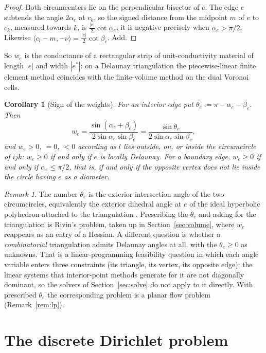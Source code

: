 \documentclass[11pt]{amsart}
\newtheorem{corollary}[theorem]{Corollary}
\theoremstyle{definition}
\theoremstyle{remark}
\newtheorem{remark}[theorem]{Remark}
\begin{document}
\begin{proof}
Both circumcenters lie on the perpendicular bisector of $e$. The edge $e$ subtends the angle $2\alpha_e$ at $c_k$, so the signed
distance from the midpoint $m$ of $e$ to $c_k$, measured towards $k$, is $\frac{|e|}2\cot\alpha_e$; it is negative precisely when
$\alpha_e>\pi/2$. Likewise $\langle c_l-m,-\nu\rangle=\frac{|e|}{2}\cot\beta_e$. Add.
\end{proof}

So $w_e$ is the conductance of a rectangular strip of unit-conductivity material of length $|e|$ and width $|e^*|$: on a
Delaunay triangulation the piecewise-linear finite element method coincides with the finite-volume method on the dual Voronoi
cells.

\begin{corollary}[Sign of the weights]\label{cor:sign}
For an interior edge put $\theta_e:=\pi-\alpha_e-\beta_e$. Then
\[
w_e=\frac{\sin(\alpha_e+\beta_e)}{2\sin\alpha_e\sin\beta_e}=\frac{\sin\theta_e}{2\sin\alpha_e\sin\beta_e},
\]
and $w_e>0$, $=0$, $<0$ according as $l$ lies outside, on, or inside the circumcircle of $ijk$: $w_e\ge0$ if and only if $e$ is
\emph{locally Delaunay}. For a boundary edge, $w_e\geq0$ if and only if $\alpha_e\le\pi/2$, that is, if and only if the opposite vertex does not lie inside
the circle having $e$ as a diameter.
\end{corollary}

\begin{remark}\label{rem:theta}
The number $\theta_e$ is the exterior intersection angle of the two circumcircles, equivalently the exterior dihedral angle at $e$ of the ideal
hyperbolic polyhedron attached to the triangulation \cite{Riv94}. Prescribing the $\theta_e$ and asking for the triangulation is Rivin's problem, taken up in Section~\ref{sec:volume}, where $w_e$ reappears as an entry of a Hessian.
A different question is whether a \emph{combinatorial} triangulation admits Delaunay angles at all, with the $\theta_e\ge0$ as unknowns. That is a linear-programming
feasibility question in which each angle variable enters three constraints (its triangle, its vertex, its opposite edge); the linear systems that
interior-point methods generate for it are not diagonally dominant, so the solvers of Section~\ref{sec:solve} do not apply to it directly. With prescribed $\theta_e$ the corresponding problem is a planar flow problem (Remark~\ref{rem:lp}).
\end{remark}

\section{The discrete Dirichlet problem}\label{sec:dirichlet}
\end{document}
